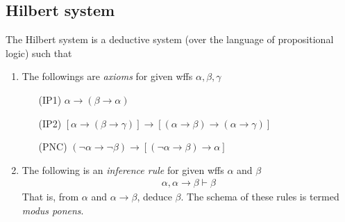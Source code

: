 \documentclass{treatise}
\begin{document}
\subsection{Hilbert system}
The Hilbert system is a deductive system (over the language of propositional logic) such that
\begin{enumerate}
    \item The followings are \emph{axioms} for given wffs $\alpha, \beta, \gamma$
    \begin{enumerate}
        \item[(IP1)] \label{HPL-A-IP1} $\alpha \to (\beta \to \alpha)$
        \item[(IP2)] \label{HPL-A-IP2} $[\alpha \to (\beta \to \gamma)] \to [(\alpha \to \beta) \to (\alpha \to \gamma)]$
        \item[(PNC)] \label{HPL-A-PNC} $(\neg \alpha \to \neg \beta) \to [(\neg \alpha \to \beta) \to \alpha]$
    \end{enumerate}
    \item \label{HPL-R-MP} The following is an \emph{inference rule} for given wffs $\alpha$ and $\beta$
    \begin{align*}
        \alpha, \alpha \to \beta \vdash \beta
    \end{align*}
    That is, from $\alpha$ and $\alpha \to \beta$, deduce $\beta$. The schema of these rules is termed \emph{modus ponens}.
\end{enumerate}
\end{document}
